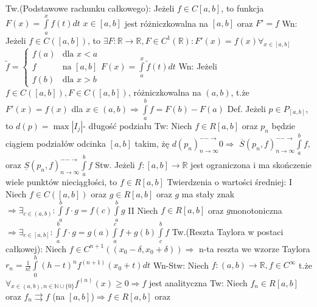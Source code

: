 \documentclass{article}
\begin{document}
Tw.(Podstawowe rachunku całkowego):\newline
Jeżeli $f\in C[a,b]$, to funkcja $F(x)=\int\limits_{a}^{x}f(t)dt$ $x\in [a,b]$ jest różniczkowalna na $[a,b]$ oraz $F'=f$\newline
Wn: Jeżeli $f\in C([a,b])$, to $\exists F:\mathbb{R}\rightarrow\mathbb{R},F\in C^1(\mathbb{R}):F'(x)=f(x)\forall_{x\in[a,b]}$
$\widetilde{f}=\left\{\begin{array}{cc}f(a)&\text{dla }x<a\\f&\text{na }[a,b]\\f(b)& \text{dla }x>b\end{array}\right. F(x)=\int\limits_{a}^{x}\widetilde{f}(t)dt$\newline
Wn: Jeżeli $f\in C([a,b]), F\in C([a,b])$, różniczkowalna na $(a,b)$, t.że $F'(x)=f(x)$ dla $x\in(a,b)\Rightarrow\int\limits_{a}^{b}f=F(b)-F(a)$\newline
Def. Jeżeli $p\in P_{[a,b]}$, to $d(p)=\max|I_j|$- długość podziału\newline
Tw: Niech $f\in R[a,b]$ oraz $p_n$ będzie ciągiem podziałów odcinka $[a,b]$ takim, żę $d(p_n)^{--\longrightarrow}_{n\rightarrow\infty}0\Rightarrow$
$\overline{S}(p_n,f)^{--\longrightarrow}_{n\rightarrow\infty}\int\limits_{a}^{b}f$,
oraz $\underline{S}(p_n,f)^{--\longrightarrow}_{n\rightarrow\infty}\int\limits_{a}^{b}f$\newline
Stw. Jeżeli $f:[a,b]\rightarrow\mathbb{R}$ jest ograniczona i ma skończenie wiele punktów nieciągłości, to $f\in R[a,b]$\newline
Twierdzenia o wartości średniej:\newline
I $ $ Niech $f\in C([a,b])$ oraz $g\in R[a,b]$ oraz $g$ ma stały znak$\Rightarrow\exists_{c\in(a,b)}:\int\limits_{a}^{b}f\cdot g=f(c)\int\limits_{a}^{b}g$\newline
II Niech $f\in R[a,b]$ oraz $g$monotoniczna $\Rightarrow\exists_{c\in[a,b]}:\int\limits_{a}^{b}f\cdot g=g(a)\int\limits_{a}^{c}f+g(b)\int\limits_{c}^{b}f$\newline
Tw.(Reszta Taylora w postaci całkowej): Niech $f\in C^{n+1}((x_0-\delta,x_0+\delta))\Rightarrow$
n-ta reszta we wzorze Taylora \newline$r_n=\frac{1}{n!}\int\limits_{0}^{h}(h-t)^nf^{(n+1)}(x_0+t)dt$\newline
Wn-Stw: Niech $f:(a,b)\rightarrow\mathbb{R},f\in C^{\infty}$ t.że $\forall_{x\in(a,b),n\in \mathbb{N}\cup\{0\}}f^{(n)}(x)\ge 0\Rightarrow f$ jest analityczna\newline
Tw: Niech $f_n\in R[a,b]$ oraz $f_n\rightrightarrows f$ (na $[a,b]$)$\Rightarrow f\in R[a,b]$ oraz
\end{document}
